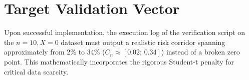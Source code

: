\documentclass[12pt,a4paper]{article}
\begin{document}
\section{Target Validation Vector}
Upon successful implementation, the execution log of the verification script on the $n=10, X=0$ dataset must output a realistic risk corridor spanning approximately from $2\%$ to $34\%$ ($C_n \approx [0.02; \, 0.34]$) instead of a broken zero point. This mathematically incorporates the rigorous Student-t penalty for critical data scarcity.
\end{document}
